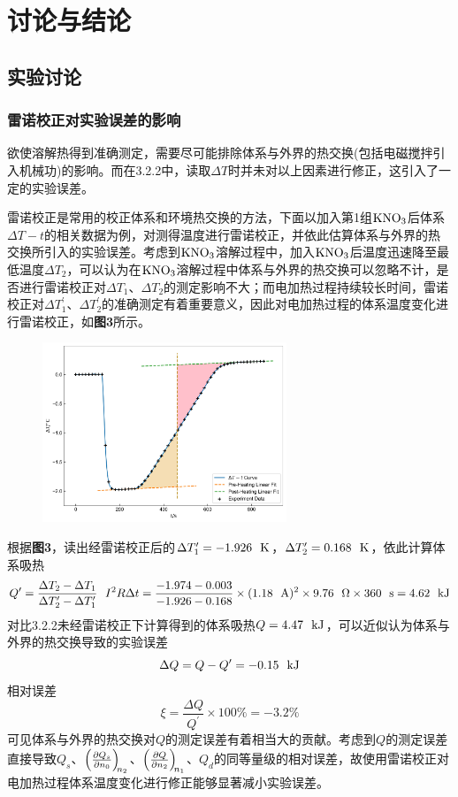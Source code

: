 \documentclass[12pt]{article}
\begin{document}
\vbox{}

 	\section{讨论与结论}
		\subsection{实验讨论}
 			\subsubsection{雷诺校正对实验误差的影响}
 			欲使溶解热得到准确测定，需要尽可能排除体系与外界的热交换(包括电磁搅拌引入机械功)的影响。而在3.2.2中，读取$\Delta T$时并未对以上因素进行修正，这引入了一定的实验误差。\par 
 			雷诺校正是常用的校正体系和环境热交换的方法，下面以加入第1组$\rm KNO_{3}$后体系$\Delta T-t$的相关数据为例，对测得温度进行雷诺校正，并依此估算体系与外界的热交换所引入的实验误差。考虑到$\rm KNO_{3}$溶解过程中，加入$\rm KNO_{3}$后温度迅速降至最低温度$\Delta T_{2}$，可以认为在$\rm KNO_{3}$溶解过程中体系与外界的热交换可以忽略不计，是否进行雷诺校正对$\Delta T_{1}$、$\Delta T_{2}$的测定影响不大；而电加热过程持续较长时间，雷诺校正对$\Delta T^{\prime}_{1}$、$\Delta T^{\prime}_{2}$的准确测定有着重要意义，因此对电加热过程的体系温度变化进行雷诺校正，如\textbf{图3}所示。
 			
 			\begin{figure}[h]
 				\centering
 				\includegraphics[width=0.65\textwidth]{3.jpg}
 			\end{figure}
 			\par
 			
 			根据\textbf{图3}，读出经雷诺校正后的$\Delta T^{\prime}_{1}=-1.926\ \ {\rm K}$，$\Delta T^{\prime}_{2}=0.168\ \ {\rm K}$，依此计算体系吸热
 			$$
 			Q^{\prime}=\frac{\Delta T_{2}-\Delta T_{1}}{\Delta T^{\prime}_{2}-\Delta T^{\prime}_{1}} \ \ I^{2}R \Delta t=\frac{-1.974-0.003}{-1.926-0.168}\times (1.18\ \ {\rm A})^{2}\times 9.76\ \ \Omega\times 360\ \ {\rm s}=4.62\ \ {\rm kJ}
 			$$
 			对比3.2.2未经雷诺校正下计算得到的体系吸热$Q=4.47\ \ {\rm kJ}$，可以近似认为体系与外界的热交换导致的实验误差
 			$$
 			\Delta Q=Q-Q^{\prime}=-0.15\ \ {\rm kJ}
 			$$
 			相对误差
 			$$
 			\xi=\frac{\Delta Q}{Q^{\prime}}\times100\%=-3.2\%
 			$$
 			可见体系与外界的热交换对$Q$的测定误差有着相当大的贡献。考虑到$Q$的测定误差直接导致$Q_{s}$、$\diffp {Q_{s}}{n_{0}}[n_{2}]$、$\diffp {Q}{n_{2}}[n_{1}]$、$Q_{d}$的同等量级的相对误差，故使用雷诺校正对电加热过程体系温度变化进行修正能够显著减小实验误差。
\end{document}
